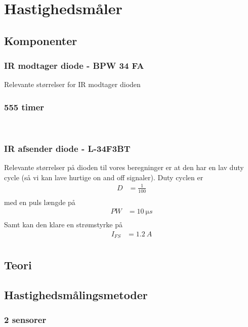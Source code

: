 \section{Hastighedsmåler}


\subsection{Komponenter}
\subsubsection{IR modtager diode - BPW 34 FA}

Relevante størrelser for IR modtager dioden \cite{kompIRmodtager}

\subsubsection{555 timer}
\

\subsubsection{IR afsender diode - L-34F3BT}

Relevante størrelser på dioden \cite{kompIRafsender} til vores beregninger er at den har en lav duty cycle (så vi kan lave hurtige on and off signaler).
Duty cyclen er
\begin{align}
	D &= \frac{1}{100} \\
\end{align}
med en puls længde på 
\begin{align}
	PW &= \SI{10}{\micro s} \\
\end{align}
Samt kan den klare en strømstyrke på 
\begin{align}
	I_{FS} &= \SI{1.2}{A} \\
\end{align}
\subsection{Teori}
\subsection{Hastighedsmålingsmetoder}
\subsubsection{2 sensorer}
